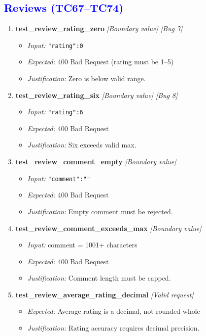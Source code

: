 \documentclass{article}
\begin{document}
\subsection*{\textcolor{blue}{Reviews (TC67--TC74)}}
\begin{enumerate}[resume, label=\textbf{TC\arabic*.}]

\item \textbf{test\_review\_rating\_zero} \textit{[Boundary value] \textit{[Bug 7]}}
\begin{itemize}[noitemsep]
  \item \textit{Input:} \texttt{"rating":0}
  \item \textit{Expected:} 400 Bad Request (rating must be 1--5)
  \item \textit{Justification:} Zero is below valid range.
\end{itemize}

\item \textbf{test\_review\_rating\_six} \textit{[Boundary value] \textit{[Bug 8]}}
\begin{itemize}[noitemsep]
  \item \textit{Input:} \texttt{"rating":6}
  \item \textit{Expected:} 400 Bad Request
  \item \textit{Justification:} Six exceeds valid max.
\end{itemize}

\item \textbf{test\_review\_comment\_empty} \textit{[Boundary value]}
\begin{itemize}[noitemsep]
  \item \textit{Input:} \texttt{"comment":""}
  \item \textit{Expected:} 400 Bad Request
  \item \textit{Justification:} Empty comment must be rejected.
\end{itemize}

\item \textbf{test\_review\_comment\_exceeds\_max} \textit{[Boundary value]}
\begin{itemize}[noitemsep]
  \item \textit{Input:} comment = 1001+ characters
  \item \textit{Expected:} 400 Bad Request
  \item \textit{Justification:} Comment length must be capped.
\end{itemize}

\item \textbf{test\_review\_average\_rating\_decimal} \textit{[Valid request]}
\begin{itemize}[noitemsep]
  \item \textit{Expected:} Average rating is a decimal, not rounded whole
  \item \textit{Justification:} Rating accuracy requires decimal precision.
\end{itemize}


\end{enumerate}
\end{document}
